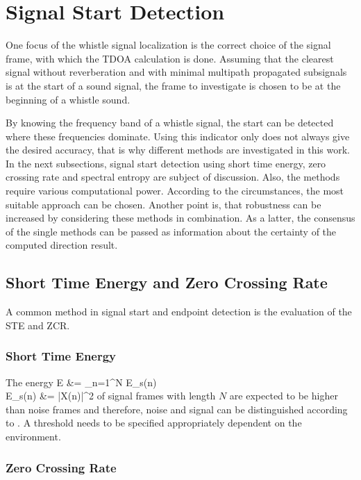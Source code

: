 \section{Signal Start Detection}
\label{sec:02_signalStartDetection}

One focus of the whistle signal localization is the correct choice of the
signal frame, with which the \ac{TDOA} calculation is done.
Assuming that the clearest signal without reverberation and with minimal
multipath propagated subsignals is at the start of a sound signal,
the frame to investigate is chosen to be at the beginning of a whistle sound.

By knowing the frequency band of a whistle signal, the start can be detected
where these frequencies dominate.
Using this indicator only does not always give the desired accuracy, that is why
different methods are investigated in this work.
In the next subsections, signal start detection using short time energy,
zero crossing rate and spectral entropy are subject of discussion.
Also, the methods require
various computational power. According to the circumstances, the most suitable
approach can be chosen.
Another point is, that robustness can be increased by considering these methods
in combination.
As a latter, the consensus of the single methods can be passed as information
about the certainty of the computed direction result.

\subsection{Short Time Energy and Zero Crossing Rate}

A common method in signal start and endpoint detection is the evaluation
of the \ac{STE} and \ac{ZCR}.

\subsubsection{Short Time Energy}
The energy
\bal
    E &= \sum_{n=1}^N E_s(n)\\
    \label{eq:02_energy}
    E_s(n) &= |X(n)|^2
    \label{eq:02_spectralEnergy}
\eal
of signal frames with length $N$ are expected to be higher than noise frames
and therefore, noise and signal can be distinguished
according to \cite{Z_W_voiceActivity}.
A threshold needs to be specified appropriately dependent on the environment.

\subsubsection{Zero Crossing Rate}


